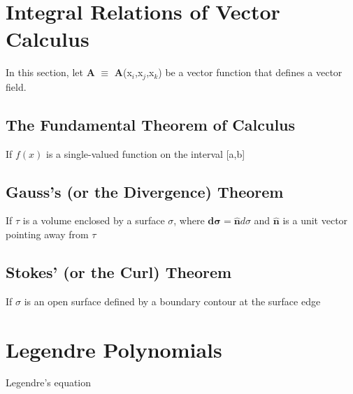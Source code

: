 \section{Integral Relations of Vector Calculus}
In this section, let \textbf{A} $\equiv$ \textbf{A}(x$_i$,x$_j$,x$_k$) be a vector function that defines a vector field. \\

\subsection{The Fundamental Theorem of Calculus}
If $f(x)$ is a single-valued function on the interval [a,b] 

\subsection{Gauss's (or the Divergence) Theorem}
If $\tau$ is a volume enclosed by a surface $\sigma$, where $\boldsymbol{d \sigma} = \boldsymbol{\hat{n}} d\sigma$ and $\boldsymbol{\hat{n}}$ is a unit vector pointing away from $\tau$ 

\subsection{Stokes' (or the Curl) Theorem}
If $\sigma$ is an open surface defined by a boundary contour at the surface edge 


\section{Legendre Polynomials}

\noindent
Legendre's equation 

